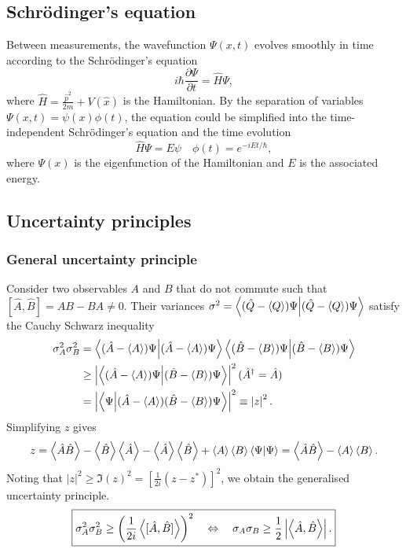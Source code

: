 \documentclass{article}
\theoremstyle{nonumberplain}
\begin{document}
\subsection{Schrödinger's equation}
Between measurements, the wavefunction $\Psi (x,t)$ evolves smoothly in time according to the Schrödinger's equation 
\begin{equation} \label{eq:SE}
    \boxed{
        i \hbar \frac{\partial \Psi }{\partial t} = \hat{H} \Psi,
    }
\end{equation}
where $\hat{H} = \frac{\hat{p}^2}{ 2m} + V(\hat{x} )$ is the Hamiltonian. By the separation of variables $\Psi (x,t) = \psi (x) \phi (t)$, the equation could be simplified into the time-independent Schrödinger's equation and the time evolution
\[
    \hat{H} \Psi = E \psi
    \quad 
    \phi (t) = e^{-i E t/ \hbar},
\]
where $\Psi(x)$ is the eigenfunction of the Hamiltonian and $E$ is the associated energy. 
\subsection{Uncertainty principles}
\subsubsection{General uncertainty principle}
Consider two observables $A$ and $B$ that do not commute such that $[\hat{A} ,\hat{B} ] = AB - BA \neq 0.$ Their variances $\sigma ^{2} = \braket{(\hat{Q} - \expval{Q}) \Psi }$ satisfy the Cauchy Schwarz inequality 
\[
    \begin{aligned}
    \sigma_A ^{2}  \sigma_B ^{2} 
    &= \braket{(\hat{A} - \expval{A}) \Psi } \braket{(\hat{B} - \expval{B}) \Psi } \\
    &\geq \left\vert \braket{(\hat{A} - \expval{A}) \Psi }{(\hat{B} - \expval{B}) \Psi } \right\vert^2 (\hat{{A}}^{\dagger} = \hat{A} )\\
    &= \left\vert \braket{ \Psi }{(\hat{A} - \expval{A}) (\hat{B} - \expval{B}) \Psi } \right\vert^2 \equiv \left\vert z \right\vert ^2.
    \end{aligned}
\]
Simplifying $z$ gives 
\[
    z = \ev{\hat{A} \hat{B} } - \expval{\hat{B} } \ev{\hat{A} } - \expval{\hat{A} } \ev{\hat{B} } + \expval{A} \expval{B} \braket{\Psi }
    = \expval{\hat{A}  \hat{B} } - \expval{A} \expval{B}.
\]
Noting that $\left\vert z \right\vert ^2 \geq  \Im(z)^2 = \left[ \frac{1}{2i} (z - z^*)\right]^{2} $, we obtain the generalised uncertainty principle. 
\begin{equation}
    \boxed{
        \sigma_A ^{2}  \sigma_B ^{2}  \geq  \left( \frac{1}{2i} \expval{[\hat{A} , \hat{B} ]}\right) ^2  
        \quad \Leftrightarrow \quad 
        \sigma_A \sigma_B \geq \frac{1}{2} \left\vert \expval{\hat{A} , \hat{B} } \right\vert. 
    }
    \label{eq:general-uncertainty}
\end{equation}
\end{document}

